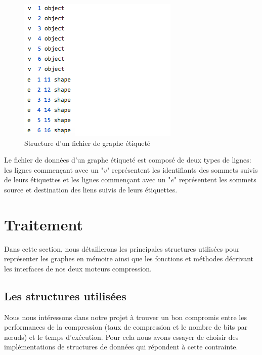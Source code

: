 \begin{itemize}[label=$\bullet$]
\begin{figure}[H]
	\label{Img:etiqGr}
	\includegraphics[scale=0.6]{ressources/image/etiquegr.png}
	\caption{Structure d'un fichier de graphe étiqueté}
 \end{figure}

Le fichier de données d'un graphe étiqueté est composé de deux types de lignes: les lignes commençant avec un "$v$" représentent les identifiants des sommets suivis de leurs étiquettes et les lignes commençant avec un "$e$" représentent les sommets source et destination des liens suivis de leurs étiquettes.
	
	\end{itemize}
	
	
	
	\section{Traitement}

Dans cette section, nous détaillerons les principales structures utilisées pour représenter les graphes en mémoire ainsi que les fonctions et méthodes décrivant les interfaces de nos deux moteurs compression. 
\subsection{Les structures utilisées }
Nous nous intéressons dans notre projet à trouver un bon compromis entre les performances de la compression (taux de compression et le nombre de bits par nœuds) et le temps d'exécution. Pour cela nous avons essayer de choisir des implémentations de structures de données qui répondent à cette contrainte.

